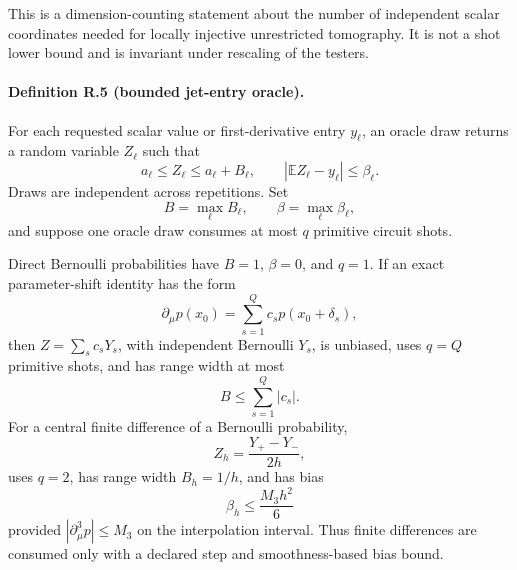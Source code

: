 \documentclass[aps,prl,reprint,superscriptaddress,nofootinbib]{revtex4-2}
\begin{document}
This is a dimension-counting statement about the number of independent scalar coordinates needed for locally injective unrestricted tomography.  It is not a shot lower bound and is invariant under rescaling of the testers.

\paragraph{Definition R.5 (bounded jet-entry oracle).}
For each requested scalar value or first-derivative entry $y_\ell$, an oracle draw returns a random variable $Z_{\ell}$ such that
\begin{equation}
 a_\ell\le Z_\ell\le a_\ell+B_\ell,
 \qquad
 |\mathbb E Z_\ell-y_\ell|\le\beta_\ell.
 \label{eq:jet-oracle}
\end{equation}
Draws are independent across repetitions.  Set
\begin{equation}
 B=\max_\ell B_\ell,
 \qquad
 \beta=\max_\ell\beta_\ell,
\end{equation}
and suppose one oracle draw consumes at most $q$ primitive circuit shots.

Direct Bernoulli probabilities have $B=1$, $\beta=0$, and $q=1$.  If an exact parameter-shift identity has the form
\begin{equation}
 \partial_\mu p(x_0)=\sum_{s=1}^{Q}c_s p(x_0+\delta_s),
 \label{eq:parameter-shift-oracle}
\end{equation}
then $Z=\sum_sc_sY_s$, with independent Bernoulli $Y_s$, is unbiased, uses $q=Q$ primitive shots, and has range width at most
\begin{equation}
 B\le\sum_{s=1}^{Q}|c_s|.
\end{equation}
For a central finite difference of a Bernoulli probability,
\begin{equation}
 Z_h=\frac{Y_+-Y_-}{2h},
 \label{eq:finite-difference-oracle}
\end{equation}
uses $q=2$, has range width $B_h=1/h$, and has bias
\begin{equation}
 \beta_h\le\frac{M_3h^2}{6}
 \label{eq:finite-difference-bias}
\end{equation}
provided $|\partial_\mu^3p|\le M_3$ on the interpolation interval.  Thus finite differences are consumed only with a declared step and smoothness-based bias bound.
\end{document}
